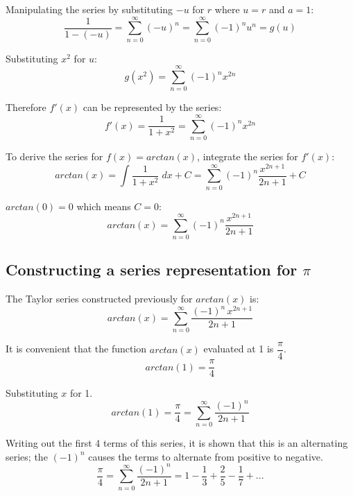 \documentclass[12pt, titlepage]{article}
\begin{document}
Manipulating the series by substituting \(-u\) for \(r\) where \(u = r\) and \(a = 1\):
\begin{equation*}
	 \frac{1}{1 - (-u)} = \sum_{n=0}^{\infty} (-u)^{n} = \sum_{n=0}^{\infty} (-1)^{n}u^{n} = g(u)  
\end{equation*}

Substituting \(x^{2}\) for \(u\): 
\begin{equation*}
    g(x^{2}) = \sum_{n=0}^{\infty} (-1)^{n}x^{2n}
\end{equation*}

Therefore \(f'(x)\) can be represented by the series:
\begin{equation*}
f'(x) = \frac{1}{1 + x^{2}} = \sum_{n=0}^{\infty} (-1)^{n}x^{2n}
\end{equation*}

To derive the series for \(f(x) = arctan(x)\), integrate the series for \(f'(x)\):
\begin{equation*}
    arctan(x) = \int \frac{1}{1+x^{2}} \; dx + C = \sum_{n=0}^{\infty} (-1)^{n}\frac{x^{2n+1}}{2n+1} + C
\end{equation*}

\(arctan(0) = 0\) which means \(C = 0\):
\begin{equation*}
    arctan(x) = \sum_{n=0}^{\infty} (-1)^{n}\frac{x^{2n+1}}{2n+1} 
\end{equation*}

\subsection{Constructing a series representation for \(\pi\)}
The Taylor series constructed previously for \(arctan(x)\) is:
\begin{equation*}
	arctan(x) = \sum^{\infty}_{n=0} \frac{(-1)^{n}\,x^{2n+1}}{2n+1}
\end{equation*}

It is convenient that the function \(arctan(x)\) evaluated at 1 is \(\dfrac{\pi}{4}\).
\begin{equation*}
    arctan(1) = \frac{\pi}{4}
\end{equation*}

Substituting \(x\) for 1.
\begin{equation*}
    arctan(1) = \frac{\pi}{4} = \sum_{n=0}^\infty{ \frac{(-1)^n}{2n+1}}
\end{equation*}

Writing out the first 4 terms of this series, it is shown that this is an alternating series; the \((-1)^{n}\) causes the terms to alternate from positive to negative.
\begin{equation*}
    \frac{\pi}{4} =\sum_{n=0}^\infty{ \frac{(-1)^n}{2n+1} = 1 - \frac{1}{3} + \frac{2}{5} - \frac{1}{7} + ... }
\end{equation*}
\end{document}
